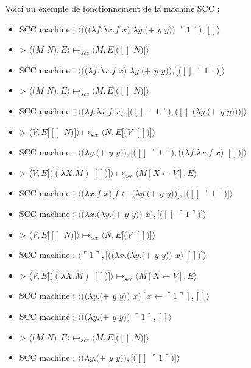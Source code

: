 \documentclass[10pt,a4paper]{article}
\begin{document}
					Voici un exemple de fonctionnement de la machine SCC :
					
					\begin{itemize}
						\item[] SCC machine : $\langle(((\lambda f.\lambda x.f$ $x)$ $\lambda y.(+$ $y$ $y))$ $\ulcorner 1\urcorner),[]\rangle$
						\item[] > $\langle(M$ $N),E\rangle \longmapsto_{scc} \langle M,E[([]$ $N)]\rangle$
						\item[] SCC machine : $\langle((\lambda f.\lambda x.f$ $x)$ $\lambda y.(+$ $y$ $y)),[([]$ $\ulcorner 1\urcorner)]\rangle$
						\item[] > $\langle(M$ $N),E\rangle \longmapsto_{scc} \langle M,E[([]$ $N)]\rangle$
						\item[] SCC machine : $\langle(\lambda f.\lambda x.f$ $x),[([]$ $\ulcorner 1\urcorner),([]$ $(\lambda y.(+$ $y$ $y)))]\rangle$
						\item[] >  $\langle V,E[[]$ $N)]\rangle \longmapsto_{scc} \langle N,E[(V$ $[])]\rangle$
						\item[] SCC machine : $\langle(\lambda y.(+$ $y$ $y)),[([]$ $\ulcorner 1\urcorner),((\lambda f.\lambda x.f$ $x)$ $[])]\rangle$
						\item[] > $\langle V,E[((\lambda X.M)$ $[])]\rangle \longmapsto_{scc} \langle M[X\leftarrow V],E\rangle$
						\item[] SCC machine : $\langle(\lambda x.f$ $x)[f\leftarrow(\lambda y.(+$ $y$ $y))],[([]$ $\ulcorner 1\urcorner)]\rangle$
						\item[] SCC machine : $\langle(\lambda x.(\lambda y.(+$ $y$ $y))$ $x),[([]$ $\ulcorner 1\urcorner)]\rangle$
						\item[] >  $\langle V,E[[]$ $N)]\rangle \longmapsto_{scc} \langle N,E[(V$ $[])]\rangle$
						\item[] SCC machine : $\langle\ulcorner 1\urcorner,[((\lambda x.(\lambda y.(+$ $y$ $y))$ $x)$ $[])]\rangle$
						\item[] > $\langle V,E[((\lambda X.M)$ $[])]\rangle \longmapsto_{scc} \langle M[X\leftarrow V],E\rangle$
						\item[] SCC machine : $\langle((\lambda y.(+$ $y$ $y))$ $x)[x \leftarrow\ulcorner 1\urcorner],[]\rangle$
						\item[] SCC machine : $\langle((\lambda y.(+$ $y$ $y))$ $\ulcorner 1\urcorner,[]\rangle$
						\item[] > $\langle(M$ $N),E\rangle \longmapsto_{scc} \langle M,E[([]$ $N)]\rangle$
						\item[] SCC machine : $\langle(\lambda y.(+$ $y$ $y)),[([]$ $\ulcorner 1\urcorner)]\rangle$

\end{itemize}
\end{document}
